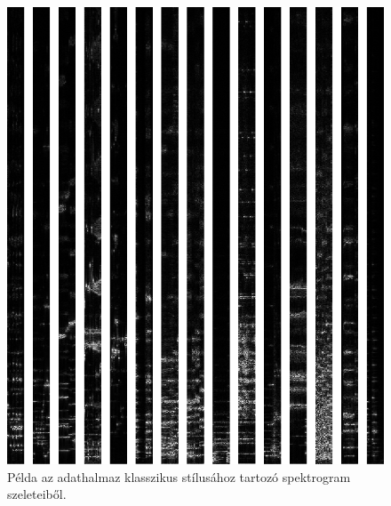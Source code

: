 \begin{figure}[p]
    \includegraphics[height=0.80\paperheight]{src/images/example_slices_classical.png}
    \caption{Példa az adathalmaz klasszikus stílusához tartozó spektrogram szeleteiből.}
\end{figure}

